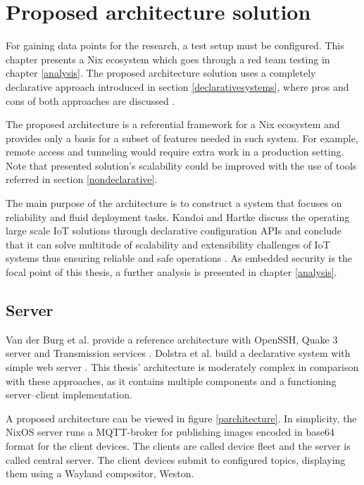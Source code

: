 \chapter{Proposed architecture solution} \label{architecture}

For gaining data points for the research, a test setup must be
configured. This chapter presents a Nix ecosystem which goes through
a red team testing in chapter \ref{analysis}. The proposed
architecture solution uses a completely declarative approach
introduced in section \ref{declarativesystems}, where pros and cons of both approaches are
discussed .

The proposed architecture is a referential framework for a Nix
ecosystem and provides only a basis for a subset of features needed in
such system. For example, remote access and tunneling would require
extra work in a production setting. Note that presented solution's
scalability could be improved with the use of tools referred in
section \ref{nondeclarative}.

The main purpose of the architecture is to construct a system that
focuses on reliability and fluid deployment tasks. Kandoi and Hartke
discuss the operating large scale IoT solutions through declarative
configuration APIs and conclude that it can solve multitude of
scalability and extensibility challenges of IoT systems thus ensuring
reliable and safe operations \cite{kandoi2021operating}. As embedded
security is the focal point of this thesis, a further analysis is
presented in chapter \ref{analysis}.

\section{Server}

Van der Burg et al. provide a reference architecture with OpenSSH,
Quake 3 server and Transmission services
\cite{van2013reference}. Dolstra et al.  build a declarative
system with simple web server \cite{dolstra2013charon}. This thesis'
architecture is moderately complex in comparison with these
approaches, as it contains multiple components and a functioning
server–client implementation.

A proposed architecture can be viewed in figure
\ref{parchitecture}. In simplicity, the NixOS server runs a
MQTT-broker for publishing images encoded in base64 format for the
client devices. The clients are called device fleet and the server
is called central server. The client devices submit to configured
topics, displaying them using a Wayland compositor, Weston.

